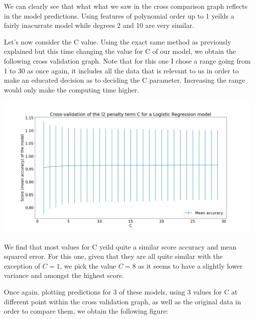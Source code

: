 \documentclass[10pt]{article}
\begin{document}
We can clearly see that what what we saw in the cross comparison graph
reflects in the model predictions. Using features of polynomial order
up to 1 yeilds a  fairly inacurrate model while degrees 2 and 10 are very
similar.

\vspace{5mm} %

Let's now consider the C value. Using the exact same method as previously explained
but this time changing the value for C of our model, we obtain the following
cross validation graph. Note that for this one I chose a range going from
1 to 30 as once again, it includes all the data that is relevant to us in order
to make an educated decision as to deciding the C parameter. Increasing
the range would only make the computing time higher.

\begin{center}
    \includegraphics[scale=0.25]{ds_1_C_cv.png}
\end{center}
\vspace{5mm} %

We find that most values for C yeild quite a similar score accuracy and mean squared
error. For this one, given that they are all quite similar with
the exception of $ C = 1 $, we pick the value $ C = 8 $ as it seems
to have a slightly lower variance and amongst the highest score.

Once again, plotting predictions for 3 of these models, using 3 values for C
at different point within the cross validation graph,
as well as the original data in order to compare them,
we obtain the following figure:
\end{document}

